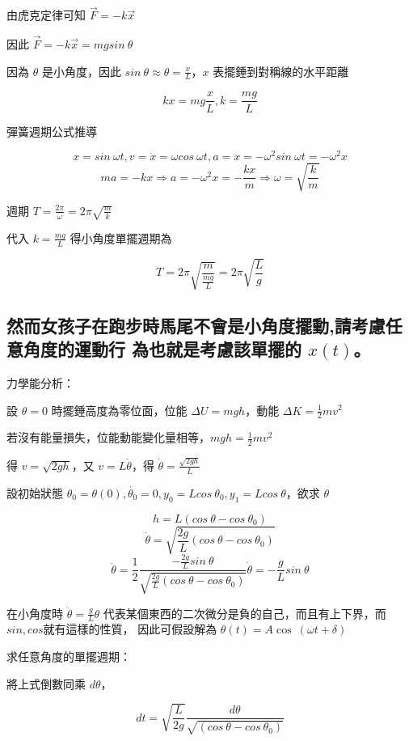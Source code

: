 \documentclass[UTF8,a4paper,12pt]{article}
\begin{document}
由虎克定律可知 $\vec{F} = -k\vec{x}$

因此 $\vec{F} = -k\vec{x} = mgsin\ \theta$

因為 $\theta$ 是小角度，因此 $sin\ \theta ≈ \theta = \frac{x}{L}$，$x$ 表擺錘到對稱線的水平距離

$$kx = mg\frac{x}{L}, k = \frac{mg}{L}$$

彈簧週期公式推導

$$x = sin\ \omega t, v = \dot{x} = \omega cos\ \omega t, a = \ddot{x} = - \omega^2 sin\ \omega t = - \omega^2 x$$
$$ma = -kx \Rightarrow a = -\omega^2 x = -\frac{kx}{m} \Rightarrow \omega = \sqrt{\frac{k}{m}}$$

週期 $T = \frac{2\pi}{\omega} = 2\pi \sqrt{\frac{m}{k}}$

代入 $k = \frac{mg}{L}$
得小角度單擺週期為

$$T = 2\pi \sqrt{\frac{m}{\frac{mg}{L}}} = 2\pi \sqrt{\frac{L}{g}}$$

\subsection{然而女孩子在跑步時馬尾不會是小角度擺動,請考慮任意角度的運動行
為也就是考慮該單擺的 \texorpdfstring{$x(t)$}{x(t)}。}

力學能分析：

設 $\theta = 0$ 時擺錘高度為零位面，位能 $\Delta U = mgh$，動能 $\Delta K = \frac{1}{2}mv^2$

若沒有能量損失，位能動能變化量相等，$mgh = \frac{1}{2}mv^2$

得 $v = \sqrt{2gh}$，又 $v = L \dot{\theta}$，得 $\dot{\theta} = \frac{\sqrt{2gh}}{L}$

設初始狀態 $\theta_0 = \theta(0), \dot{\theta_0} = 0 , y_0 = L cos\ \theta_0, y_1 = L cos\ \theta$，欲求 $\theta$

$$h = L(cos\ \theta - cos\ \theta_0)$$
$$\dot{\theta} = \sqrt{\frac{2g}{L}(cos\ \theta - cos\ \theta_0)} $$
$$\ddot{\theta} = \frac{1}{2} \frac{-\frac{2g}{L}sin\ \theta}{\sqrt{\frac{2g}{L}(cos\ \theta - cos\ \theta_0)}} \dot{\theta} = -\frac{g}{L}sin\ \theta $$

在小角度時 $\ddot{\theta} = \frac{g}{L}\theta $
代表某個東西的二次微分是負的自己，而且有上下界，而$sin, cos$就有這樣的性質，
因此可假設解為 $\theta(t) = A \cos\ (\omega t + \delta)$

求任意角度的單擺週期：

將上式倒數同乘 $d\theta$，

$$ dt = \sqrt{\frac{L}{2g}}\frac{d\theta}{\sqrt{(cos\ \theta - cos\ \theta_0)}} $$
\end{document}
